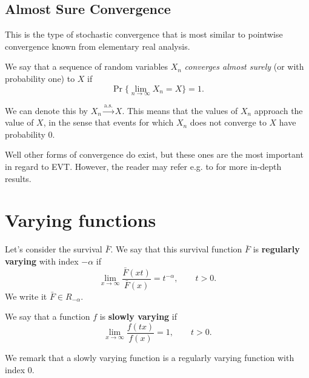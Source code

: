 \subsection*{Almost Sure Convergence} 

This is the type of stochastic convergence that is most similar to pointwise convergence known from elementary real analysis.

\begin{definition}
We say that a sequence of random variables $X_n$ \emph{converges almost surely} (or with probability one) to $X$ if 
\begin{equation}
 \Pr \Big\{ \lim_{n \to \infty} X_n = X \Big\} = 1.
\end{equation}
\end{definition}
We can denote this by $X_n\stackrel{\text{a.s.}}{\rightarrow} X$. This means that the values of $X_n$ approach the value of $X$, in the sense that events for which $X_n$ does not converge to $X$ have probability 0.


Well other forms of convergence do exist, but these ones are the most important in regard to EVT. However, the reader may refer e.g. to \citet{lafaye_understanding_2009}  for more in-depth results.

\section{Varying functions}\label{app:varying}

\begin{definition}
Let's consider the survival $\bar{F}$. We say that this survival function $\bar{F}$ is \textbf{regularly varying} with index $-\alpha$ if
\begin{equation}
\displaystyle{\lim_{x \to \infty}} \frac{\bar{F}(xt)}{\bar{F}(x)}=t^{-\alpha}, \qquad t>0. 
\end{equation}
We write it $\bar{F}\in R_{-\alpha}$.
\end{definition}

\begin{definition}
We say that a function $f$ is \textbf{slowly varying} if
\begin{equation}
\displaystyle{\lim_{x \to \infty}} \frac{f(t x)}{f(x)}=1, \qquad t>0. 
\end{equation}
\end{definition}
We remark that a slowly varying function is a regularly varying function with index 0.



